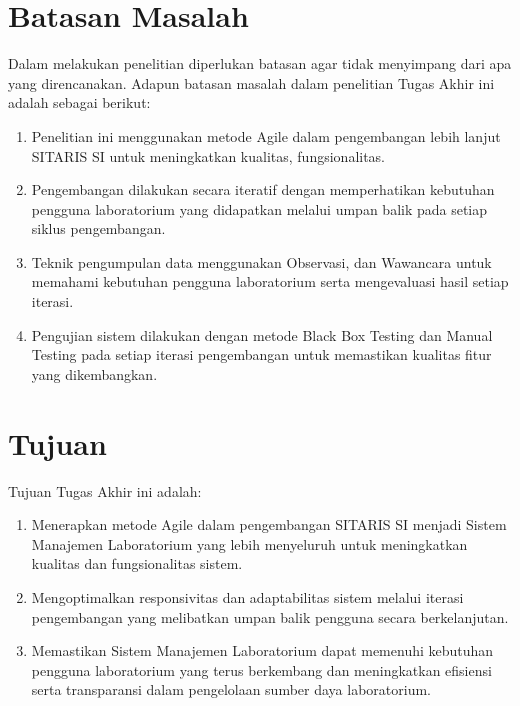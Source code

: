 \section{Batasan Masalah}
Dalam melakukan penelitian diperlukan batasan agar tidak menyimpang dari apa yang direncanakan. Adapun batasan masalah dalam penelitian Tugas Akhir ini adalah sebagai berikut:
\begin{enumerate}
	\item Penelitian ini menggunakan metode Agile dalam pengembangan lebih lanjut SITARIS SI untuk meningkatkan kualitas, fungsionalitas.
	\item Pengembangan dilakukan secara iteratif dengan memperhatikan kebutuhan pengguna laboratorium yang didapatkan melalui umpan balik pada setiap siklus pengembangan.
	\item Teknik pengumpulan data menggunakan Observasi, dan Wawancara untuk memahami kebutuhan pengguna laboratorium serta mengevaluasi hasil setiap iterasi.
	\item Pengujian sistem dilakukan dengan metode Black Box Testing dan Manual Testing pada setiap iterasi pengembangan untuk memastikan kualitas fitur yang dikembangkan.
\end{enumerate}

\section{Tujuan}
Tujuan Tugas Akhir ini adalah:

\begin{enumerate}
	\item Menerapkan metode Agile dalam pengembangan SITARIS SI menjadi Sistem Manajemen Laboratorium yang lebih menyeluruh untuk meningkatkan kualitas dan fungsionalitas sistem.
	\item Mengoptimalkan responsivitas dan adaptabilitas sistem melalui iterasi pengembangan yang melibatkan umpan balik pengguna secara berkelanjutan.
	\item Memastikan Sistem Manajemen Laboratorium dapat memenuhi kebutuhan pengguna laboratorium yang terus berkembang dan meningkatkan efisiensi serta transparansi dalam pengelolaan sumber daya laboratorium.
\end{enumerate}


